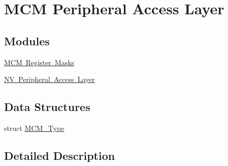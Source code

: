 \hypertarget{group___m_c_m___peripheral___access___layer}{}\section{M\+CM Peripheral Access Layer}
\label{group___m_c_m___peripheral___access___layer}
\subsection*{Modules}
\begin{DoxyCompactItemize}
\item 
\mbox{\hyperlink{group___m_c_m___register___masks}{M\+C\+M Register Masks}}
\item 
\mbox{\hyperlink{group___n_v___peripheral___access___layer}{N\+V Peripheral Access Layer}}
\end{DoxyCompactItemize}
\subsection*{Data Structures}
\begin{DoxyCompactItemize}
\item 
struct \mbox{\hyperlink{struct_m_c_m___type}{M\+C\+M\+\_\+\+Type}}
\end{DoxyCompactItemize}


\subsection{Detailed Description}
